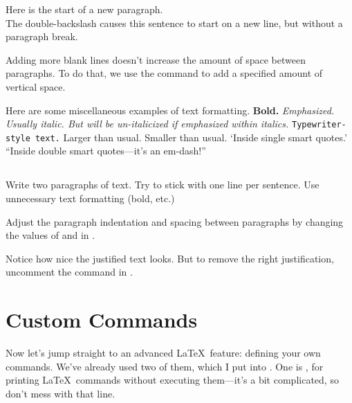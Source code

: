 \documentclass{article}
\begin{document}
Here is the start of a new paragraph.  \\
The double-backslash causes this sentence to start on a new line, but without a paragraph break.

\vspace{20pt}
Adding more blank lines doesn't increase the amount of space between paragraphs.
To do that, we use the \latexcode{\\vspace} command to add a specified amount of vertical space.

Here are some miscellaneous examples of text formatting.
\textbf{Bold.}
\emph{Emphasized.  Usually italic.  But will be un-italicized if \emph{emphasized} within italics.}
\texttt{Typewriter-style text.}
\large{Larger than usual.}
\small{Smaller than usual.}
`Inside single smart quotes.'
``Inside double smart quotes---it's an em-dash!''

\subsection*{\task}

Write two paragraphs of text.
Try to stick with one line per sentence.
Use unnecessary text formatting (bold, etc.)

Adjust the paragraph indentation and spacing between paragraphs by changing the values of \latexcode{\\parindent} and \latexcode{\\parskip} in .

Notice how nice the justified text looks.
But to remove the right justification, uncomment the \latexcode{\\raggedright} command in .

\section{Custom Commands}
\label{sec:custom}

Now let's jump straight to an advanced \LaTeX\ feature: defining your own commands.
We've already used two of them, which I put into .
One is \latexcode{\\latexcode}, for printing \LaTeX\ commands without executing them---it's a bit complicated, so don't mess with that line.

\subsection*{\task}
\end{document}
